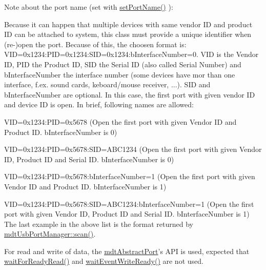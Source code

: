 Note about the port name (set with \hyperlink{classmdt_abstract_port_a0ca143d32fc677bac7c1cf0e04144932}{set\-Port\-Name()} )\-:\par
 Because it can happen that multiple devices with same vendor I\-D and product I\-D can be attached to system, this class must provide a unique identifier when (re-\/)open the port. Because of this, the choosen format is\-: V\-I\-D=0x1234\-:P\-I\-D=0x1234\-:S\-I\-D=0x1234\-:b\-Interface\-Number=0. V\-I\-D is the Vendor I\-D, P\-I\-D the Product I\-D, S\-I\-D the Serial I\-D (also called Serial Number) and b\-Interface\-Number the interface number (some devices have mor than one interface, f.\-ex. sound cards, keboard/mouse receiver, ...). S\-I\-D and b\-Interface\-Number are optional. In this case, the first port with given vendor I\-D and device I\-D is open. In brief, following names are allowed\-:
\begin{DoxyItemize}
\item V\-I\-D=0x1234\-:P\-I\-D=0x5678 (Open the first port with given Vendor I\-D and Product I\-D. b\-Interface\-Number is 0)
\item V\-I\-D=0x1234\-:P\-I\-D=0x5678\-:S\-I\-D=A\-B\-C1234 (Open the first port with given Vendor I\-D, Product I\-D and Serial I\-D. b\-Interface\-Number is 0)
\item V\-I\-D=0x1234\-:P\-I\-D=0x5678\-:b\-Interface\-Number=1 (Open the first port with given Vendor I\-D and Product I\-D. b\-Interface\-Number is 1)
\item V\-I\-D=0x1234\-:P\-I\-D=0x5678\-:S\-I\-D=A\-B\-C1234\-:b\-Interface\-Number=1 (Open the first port with given Vendor I\-D, Product I\-D and Serial I\-D. b\-Interface\-Number is 1) The last example in the above list is the format returned by \hyperlink{classmdt_usb_port_manager_a3a2370c3a2d0353a880bf9b777728c3b}{mdt\-Usb\-Port\-Manager\-::scan()}.
\end{DoxyItemize}

For read and write of data, the \hyperlink{classmdt_abstract_port}{mdt\-Abstract\-Port}'s A\-P\-I is used, expected that \hyperlink{classmdt_usb_port_ab8ddd4ebee603ac381e8da0383a61e36}{wait\-For\-Ready\-Read()} and \hyperlink{classmdt_usb_port_a3be875f6f10ae94fd3a94f925bb935e7}{wait\-Event\-Write\-Ready()} are not used.

